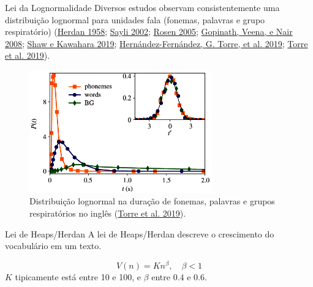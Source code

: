 \documentclass[
  ignorenonframetext,
  aspectratio=169]{beamer}
\begin{document}
\begin{frame}{Lei da Lognormalidade}
\protect\hypertarget{lei-da-lognormalidade}{}
Diversos estudos observam consistentemente uma distribuição lognormal
para unidades fala (fonemas, palavras e grupo respiratório)
(\protect\hyperlink{ref-herdan1958relation}{Herdan 1958};
\protect\hyperlink{ref-sayli2002duration}{Sayli 2002};
\protect\hyperlink{ref-rosen2005analysis}{Rosen 2005};
\protect\hyperlink{ref-gopinath2008modeling}{Gopinath, Veena, e Nair
2008}; \protect\hyperlink{ref-shaw2019effects}{Shaw e Kawahara 2019};
\protect\hyperlink{ref-hernandez2019linguistic}{Hernández-Fernández, G.
Torre, et al. 2019}; \protect\hyperlink{ref-Torre2019}{Torre et al.
2019}).
\end{frame}

\begin{frame}
\begin{figure}
\centering
\includegraphics[width=0.7\textwidth,height=\textheight]{lognormal.png}
\caption{Distribuição lognormal na duração de fonemas, palavras e grupos
respiratórios no inglês (\protect\hyperlink{ref-Torre2019}{Torre et al.
2019}).\label{fig-lognormal}}
\end{figure}

\end{frame}

\begin{frame}{Lei de Heaps/Herdan}
\protect\hypertarget{lei-de-heapsherdan}{}
A lei de Heaps/Herdan descreve o crescimento do vocabulário em um texto.

\[
V(n) = K n^\beta, \quad \beta < 1
\] \(K\) tipicamente está entre 10 e 100, e \(\beta\) entre \(0.4\) e
\(0.6\).
\end{frame}
\end{document}

